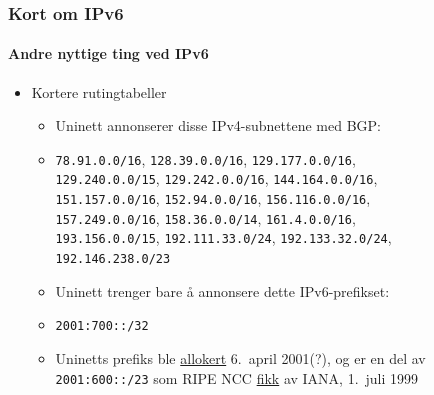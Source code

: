\begin{frame}
  \frametitle{Kort om IPv6}
  \framesubtitle{Andre nyttige ting ved IPv6}
  \begin{itemize}
  \item Kortere rutingtabeller
    \begin{itemize}
    \item Uninett annonserer disse IPv4-subnettene med BGP:
    \item \texttt{78.91.0.0/16}, \hfill\alert<2>{\texttt{128.39.0.0/16}}, \hfill\texttt{129.177.0.0/16},\\
      \texttt{129.240.0.0/15}, \hfill\texttt{129.242.0.0/16}, \hfill\texttt{144.164.0.0/16},\\
      \texttt{151.157.0.0/16}, \hfill\texttt{152.94.0.0/16}, \hfill\texttt{156.116.0.0/16},\\
      \texttt{157.249.0.0/16}, \hfill\texttt{158.36.0.0/14}, \hfill\texttt{161.4.0.0/16},\\
      \texttt{193.156.0.0/15}, \hfill\texttt{192.111.33.0/24}, \hfill\texttt{192.133.32.0/24},\\
      \hfill\texttt{192.146.238.0/23}\hfill\null
    \item Uninett trenger bare å annonsere dette IPv6-prefikset:
    \item \texttt{2001:700::/32}
    \item Uninetts prefiks ble
      \href{https://apps.db.ripe.net/db-web-ui/\#/lookup?source=ripe\&key=2001:700::\%2F32\&type=inet6num}{allokert}
      6.~april 2001(?), og er en del av \texttt{2001:600::/23} som
      RIPE NCC
      \href{http://www.iana.org/assignments/ipv6-unicast-address-assignments/ipv6-unicast-address-assignments.xhtml}{fikk}
      av IANA, 1.~juli 1999
    \end{itemize}
  \end{itemize}
\end{frame}

